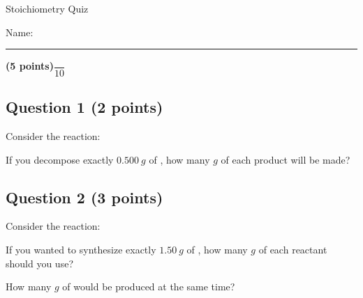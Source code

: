 \documentclass[12pt, letterpaper]{memoir}
\begin{document}
	\begin{center}
		{\large Stoichiometry Quiz}
	\end{center}
	{\large Name: \rule[-1mm]{4in}{.1pt} {\bfseries (5 points)}\hspace{4em}$\dfrac{~}{10}$} 
	
	\subsection*{Question 1 (2 points)}
	Consider the reaction: 
	
	\noindent
	If you decompose exactly $0.500~g$ of , how many $g$ of each product will be made?
	
	\vspace{15em}
	\subsection*{Question 2 (3 points)}
	Consider the reaction: 
	
	\noindent
	If you wanted to synthesize exactly $1.50~g$ of , how many $g$ of each reactant should you use?
	
	\vspace{15em}
	\noindent 
	How many $g$ of  would be produced at the same time?
\end{document}
